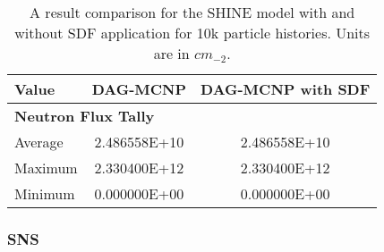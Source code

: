 \begin{table}[H]
  \small
  \begin{center}
    \begin{tabular}{lcc}
          \toprule
          Value   & DAG-MCNP     & DAG-MCNP with SDF      \\
          \toprule
          \multicolumn{3}{l}{\textbf{Neutron Flux Tally}} \\
          Average & 2.486558E+10 & 2.486558E+10           \\
          Maximum & 2.330400E+12 & 2.330400E+12           \\
          Minimum & 0.000000E+00 & 0.000000E+00           \\
          \bottomrule
    \end{tabular}
  \end{center}
  \caption[Flux tally results in the SHINE model for various DAG-MCNP
    implementations.]{A result comparison for the SHINE model with and without
    SDF application for 10k particle histories. Units are in $cm_{-2}$.}
\end{table}

\subsubsection{SNS}


